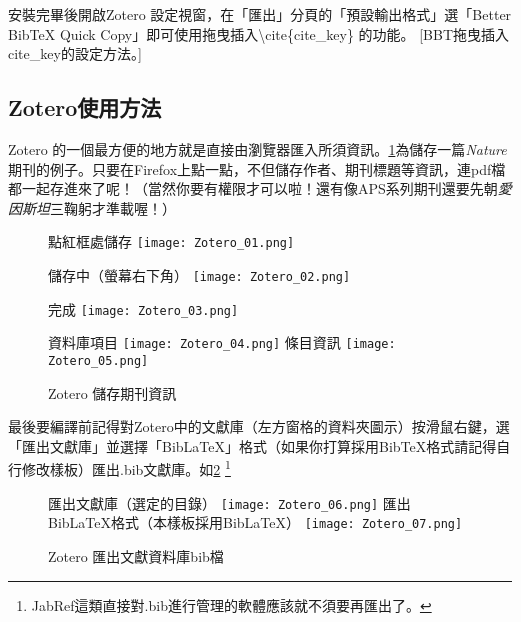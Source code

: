 \documentclass[class=NCU_thesis, crop=false, float=true]{standalone}
\begin{document}
安裝完畢後開啟Zotero 設定視窗，在「匯出」分頁的「預設輸出格式」選「Better BibTeX Quick Copy」即可使用拖曳插入\textbackslash{}cite\{cite\_key\} 的功能。
[BBT拖曳插入cite\_key的設定方法。]
\subsection{Zotero使用方法}
Zotero 的一個最方便的地方就是直接由瀏覽器匯入所須資訊。\cref{fig:zotero_save}為儲存一篇\emph{Nature}期刊的例子。只要在Firefox上點一點，不但儲存作者、期刊標題等資訊，連pdf檔都一起存進來了呢！（當然你要有權限才可以啦！還有像APS系列期刊還要先朝\emph{愛因斯坦}三鞠躬才準載喔！）
\begin{figure}
    \centering
    \subcaptionbox
        {點紅框處儲存
        \label{fig:Zotero_01}}
        {\texttt{[image: Zotero\_01.png]}}
        
    \vspace{\baselineskip}
    \subcaptionbox
        {儲存中（螢幕右下角）
        \label{fig:Zotero_02}}
        {\texttt{[image: Zotero\_02.png]}}
        
    \vspace{\baselineskip} %
    \subcaptionbox
        {完成
        \label{fig:Zotero_03}}
        {\texttt{[image: Zotero\_03.png]}}
    
    \vspace{\baselineskip} %
    \subcaptionbox
        {資料庫項目
        \label{fig:Zotero_04}}
        {\texttt{[image: Zotero\_04.png]}}
    \hspace{0.8cm}
    \subcaptionbox
        {條目資訊
        \label{fig:Zotero_05}}
        {\texttt{[image: Zotero\_05.png]}}
    \caption{Zotero 儲存期刊資訊}
    \label{fig:zotero_save}
\end{figure}

最後要編譯前記得對Zotero中的文獻庫（左方窗格的資料夾圖示）按滑鼠右鍵，選「匯出文獻庫」並選擇「BibLaTeX」格式（如果你打算採用BibTeX格式請記得自行修改樣板）匯出.bib文獻庫。如\cref{fig:zotero_exportBib}
\footnote{JabRef這類直接對.bib進行管理的軟體應該就不須要再匯出了。}
\begin{figure}
    \centering
    \subcaptionbox
        {匯出文獻庫（選定的目錄）
        \label{fig:Zotero_06}}
        {\texttt{[image: Zotero\_06.png]}}
    \hspace{2em}
    \subcaptionbox
        {匯出BibLaTeX格式（本樣板採用BibLaTeX）
        \label{fig:Zotero_07}}
        {\texttt{[image: Zotero\_07.png]}}
    \caption{Zotero 匯出文獻資料庫bib檔}
    \label{fig:zotero_exportBib}
\end{figure}
\end{document}
